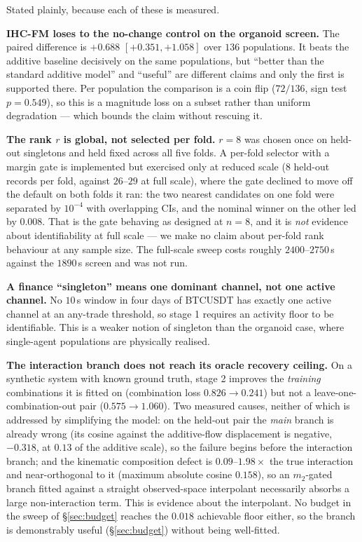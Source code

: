 \documentclass{article}
\begin{document}
Stated plainly, because each of these is measured.

\textbf{IHC-FM loses to the no-change control on the organoid screen.} The paired difference
is $+0.688$ $[+0.351, +1.058]$ over $136$ populations. It beats the additive baseline
decisively on the same populations, but ``better than the standard additive model'' and
``useful'' are different claims and only the first is supported there. Per population the
comparison is a coin flip ($72/136$, sign test $p=0.549$), so this is a magnitude loss on a
subset rather than uniform degradation --- which bounds the claim without rescuing it.

\textbf{The rank $r$ is global, not selected per fold.} $r{=}8$ was chosen once on held-out
singletons and held fixed across all five folds. A per-fold selector with a margin gate is
implemented but exercised only at reduced scale ($8$ held-out records per fold, against
$26$--$29$ at full scale), where the gate declined to move off the default on both folds it
ran: the two nearest candidates on one fold were separated by $10^{-4}$ with overlapping
CIs, and the nominal winner on the other led by $0.008$. That is the gate behaving as
designed at $n{=}8$, and it is \emph{not} evidence about identifiability at full scale ---
we make no claim about per-fold rank behaviour at any sample size. The full-scale sweep
costs roughly $2400$--$2750$\,s against the $1890$\,s screen and was not run.

\textbf{A finance ``singleton'' means one dominant channel, not one active channel.} No
$10$\,s window in four days of BTCUSDT has exactly one active channel at an any-trade
threshold, so stage 1 requires an activity floor to be identifiable. This is a weaker notion
of singleton than the organoid case, where single-agent populations are physically
realised.

\textbf{The interaction branch does not reach its oracle recovery ceiling.} On a synthetic
system with known ground truth, stage 2 improves the \emph{training} combinations it is
fitted on (combination loss $0.826 \to 0.241$) but not a leave-one-combination-out pair
($0.575 \to 1.060$). Two measured causes, neither of which is addressed by simplifying the
model: on the held-out pair the \emph{main} branch is already wrong (its cosine against the
additive-flow displacement is negative, $-0.318$, at $0.13$ of the additive scale), so the
failure begins before the interaction branch; and the kinematic composition defect is
$0.09$--$1.98\times$ the true interaction and near-orthogonal to it (maximum absolute cosine
$0.158$), so an $m_{2}$-gated branch fitted against a straight observed-space interpolant
necessarily absorbs a large non-interaction term. This is evidence about the interpolant.
No budget in the sweep of \S\ref{sec:budget} reaches the $0.018$ achievable floor either,
so the branch is demonstrably useful (\S\ref{sec:budget}) without being well-fitted.
\end{document}
